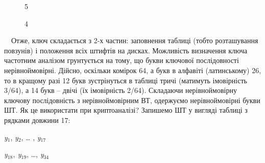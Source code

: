 \documentclass[a4paper]{article}
\newcommand\textsubscript[1]{\ensuremath{{}_{\text{#1}}}}
\newcounter{}
\begin{document}
\begin{figure}
\centering
\begin{minipage}{1in}
 5
\end{minipage}
\end{figure}
\begin{figure}
\centering
\begin{minipage}{0.1252in}
4
\end{minipage}
\end{figure}
\begin{figure}
\centering
\begin{minipage}{0.2209in}

\bigskip
\end{minipage}
\end{figure}
\begin{figure}
\centering
\begin{minipage}{0.3252in}

\bigskip
\end{minipage}
\end{figure}
\begin{figure}
\centering
\begin{minipage}{0.1957in}

\bigskip
\end{minipage}
\end{figure}
\begin{figure}
\centering
\begin{minipage}{0.4374in}

\bigskip
\end{minipage}
\end{figure}
\ \ Отже, ключ складається з 2-х частин: заповнення таблиці (тобто розташування
повзунів) і положення всіх штифтів на дисках. Можливість визначення ключа
частотним аналізом грунтується на тому, що букви ключової послідовності
нерівноймовірні. Дійсно, оскільки комірок 64, а букв в алфавіті (латинському)
26, то в кращому разі 12 букв зустрінуться в таблиці тричі (матимуть
імовірність 3/64), а 14 букв – двічі (їх імовірність 2/64). Складаючи
нерівноймовірну ключову послідовність з нерівноймовірним ВТ, одержуємо
нерівноймовірні букви ШТ. Як це використати при криптоаналізі? Запишемо ШТ у
вигляді таблиці з рядками довжини 17:

{\centering
\textit{y}\textsubscript{1},  \textit{y}\textit{\textsubscript{2}}, … ,\textit{ 
y}\textit{\textsubscript{17}}
\par}

{\centering
\textit{y}\textit{\textsubscript{18}},  \textsubscript{
}\textit{y}\textit{\textsubscript{19}}, …,
\textit{y}\textit{\textsubscript{34}}
\par}
\end{document}

